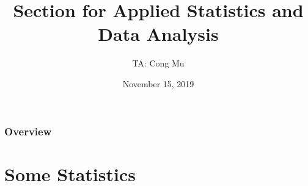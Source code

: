 \documentclass[serif,mathserif,professionalfont]{beamer}
\title[Section for EN.553.413/613]{Section for Applied Statistics and Data Analysis} %
\author{TA: Cong Mu} %
\institute[cmu2@jhu.edu] %
{
Office Hour: Wednesday 10:00AM - 12:00PM
\medskip
\textit{} %
}
\date{November 15, 2019} %
\begin{document}
\begin{frame}
\titlepage %
\end{frame}

\begin{frame}
\frametitle{Overview} %
\tableofcontents %
\end{frame}




\section{Some Statistics}


%	
%    	
	
\end{document}
